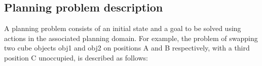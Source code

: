 
\newpage
\subsection{Planning problem description}\label{subsec:PPDescription}
A planning problem consists of an initial state and a goal to be solved using actions in the associated planning domain.
For example, the problem of swapping two cube objects obj1 and obj2 on positions A and B respectively, with a third position C unoccupied, is described as follows:

